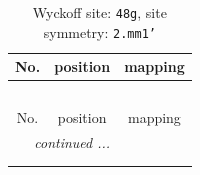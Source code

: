 \documentclass[fleqn,8pt]{jsarticle}
\begin{document}
\renewcommand{\arraystretch}{1.2}
\begin{longtable}{ccc}
\caption{Wyckoff site: {\tt 48g}, site symmetry: {\tt 2.mm1'}}
 \\
 \hline \hline
No. & position & mapping \\ \hline \endfirsthead

\multicolumn{2}{l}{\tablename\ \thetable{}} \\
 \hline \hline
No. & position & mapping \\ \hline \endhead

 \hline \hline
\multicolumn{2}{r}{\footnotesize\it continued ...} \\ \endfoot

 \hline \hline
\multicolumn{2}{r}{} \\ \endlastfoot


\end{longtable}
\end{document}
